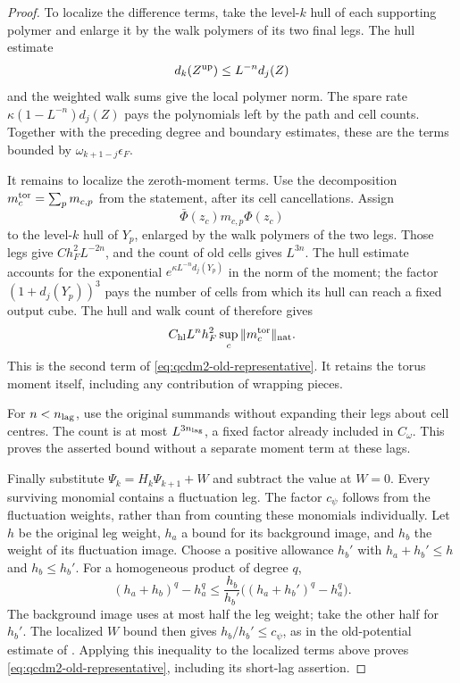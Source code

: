 \documentclass[11pt,letterpaper,reqno]{amsart}
\theoremstyle{definition}
\theoremstyle{remark}
\begin{document}
\begin{proof}
To localize the difference terms, take the level-$k$
hull of each supporting polymer and enlarge it by the
walk polymers of its two final legs.  The hull estimate
\[
 d_k(Z^{\rm up})\le L^{-n}d_j(Z)
\]
and the weighted walk sums give the local polymer norm.
The spare rate $\kappa(1-L^{-n})d_j(Z)$ pays the
polynomials left by the path and cell counts.  Together
with the preceding degree and boundary estimates,
these are the terms bounded by
$\omega_{k+1-j}\epsilon_F$.

It remains to localize the zeroth-moment terms.  Use the
decomposition $m_c^{\rm tor}=\sum_pm_{c,p}$ from the
statement, after its cell cancellations.  Assign
\[
 \bar\Phi(z_c)m_{c,p}\Phi(z_c)
\]
to the level-$k$ hull of $Y_p$, enlarged by the walk
polymers of the two legs.  Those legs give
$Ch_F^2L^{-2n}$, and the count of old cells gives
$L^{3n}$.  The hull estimate accounts for the exponential
$e^{\kappa L^{-n}d_j(Y_p)}$ in the norm of the moment;
the factor $(1+d_j(Y_p))^3$ pays the number of cells
from which its hull can reach a fixed output cube.
The hull and walk count of \cite[Prop. 10.1]{QCDM1}
therefore gives
\[
 C_{\rm hl}L^nh_F^2
                  \sup_c\|m_c^{\rm tor}\|_{\rm nat}.
\]
This is the second term of
\eqref{eq:qcdm2-old-representative}.  It retains the
torus moment itself, including any contribution of
wrapping pieces.

For $n<n_{\rm lag}$, use the original summands without
expanding their legs about cell centres.  The count is
at most $L^{3n_{\rm lag}}$, a fixed factor already
included in $C_\omega$.  This proves the asserted bound
without a separate moment term at these lags.

Finally substitute $\Psi_k=H_k\Psi_{k+1}+W$ and
subtract the value at $W=0$.  Every surviving monomial
contains a fluctuation leg.  The factor $c_\psi$ follows
from the fluctuation weights, rather than from counting
these monomials individually.  Let $h$ be the original
leg weight, $h_a$ a bound for its background image,
and $h_b$ the weight of its fluctuation image.
Choose a positive allowance $h_b'$ with
$h_a+h_b'\le h$ and $h_b\le h_b'$. For a homogeneous
product of degree $q$,
\[
 (h_a+h_b)^q-h_a^q
 \le\frac{h_b}{h_b'}
            \bigl((h_a+h_b')^q-h_a^q\bigr).
\]
The background image uses at most half the leg weight;
take the other half for $h_b'$. The localized $W$ bound
then gives $h_b/h_b'\le c_\psi$, as in
the old-potential estimate of \cite[\S7]{QCDM1}.
Applying this inequality to the localized terms above
proves \eqref{eq:qcdm2-old-representative}, including
its short-lag assertion.


\end{proof}
\end{document}
